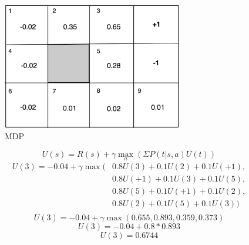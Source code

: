 \documentclass[paper=a4, fontsize=11pt]{scrartcl} %
\begin{document}
\begin{figure}[hp]
  \centering
  \includegraphics[width=0.7\textwidth]{mdp_utility.png}
  \caption{MDP}
\label{fig:mdpu}
\end{figure}

$$U(s) = R(s) + \gamma\max_a(\Sigma P(t|s,a)U(t))$$
\[
\begin{split}
  U(3) = -0.04 + \gamma\max(& 0.8U(3)+0.1U(2)+0.1U(+1),\\
  & 0.8U(+1)+0.1U(3)+0.1U(5),\\
  & 0.8U(5)+0.1U(+1)+0.1U(2),\\
  & 0.8U(2)+0.1U(5)+0.1U(3))\\
\end{split}
\]
$$U(3) = -0.04 + \gamma\max(0.655, 0.893, 0.359, 0.373)$$
$$U(3) = -0.04 + 0.8 * 0.893$$
$$U(3) = 0.6744$$

\pagebreak
\end{document}
